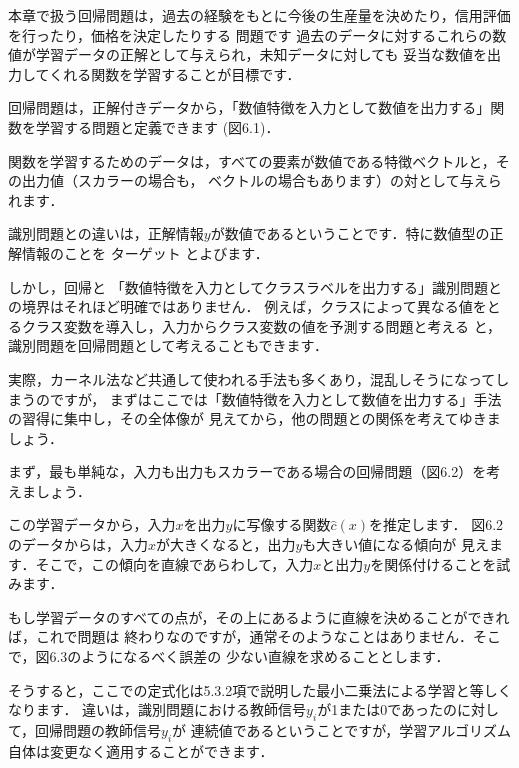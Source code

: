 
本章で扱う回帰問題は，過去の経験をもとに今後の生産量を決めたり，信用評価を行ったり，価格を決定したりする
問題です
過去のデータに対するこれらの数値が学習データの正解として与えられ，未知データに対しても
妥当な数値を出力してくれる関数を学習することが目標です．

回帰問題は，正解付きデータから，「数値特徴を入力として数値を出力する」関数を学習する問題と定義できます
(図6.1)．



関数を学習するためのデータは，すべての要素が数値である特徴ベクトルと，その出力値（スカラーの場合も，
ベクトルの場合もあります）の対として与えられます．


識別問題との違いは，正解情報$y$が数値であるということです．特に数値型の正解情報のことを
ターゲット
とよびます．

しかし，回帰と
「数値特徴を入力としてクラスラベルを出力する」識別問題との境界はそれほど明確ではありません．
例えば，クラスによって異なる値をとるクラス変数を導入し，入力からクラス変数の値を予測する問題と考える
と，識別問題を回帰問題として考えることもできます．

実際，カーネル法など共通して使われる手法も多くあり，混乱しそうになってしまうのですが，
まずはここでは「数値特徴を入力として数値を出力する」手法の習得に集中し，その全体像が
見えてから，他の問題との関係を考えてゆきましょう．



まず，最も単純な，入力も出力もスカラーである場合の回帰問題（図6.2）を考えましょう．


この学習データから，入力$x$を出力$y$に写像する関数$\hat{c}(x)$を推定します．
図6.2のデータからは，入力$x$が大きくなると，出力$y$も大きい値になる傾向が
見えます．そこで，この傾向を直線であらわして，入力$x$と出力$y$を関係付けることを試みます．


もし学習データのすべての点が，その上にあるように直線を決めることができれば，これで問題は
終わりなのですが，通常そのようなことはありません．そこで，図6.3のようになるべく誤差の
少ない直線を求めることとします．


そうすると，ここでの定式化は5.3.2項で説明した最小二乗法による学習と等しくなります．
違いは，識別問題における教師信号$y_i$が1または0であったのに対して，回帰問題の教師信号$y_i$が
連続値であるということですが，学習アルゴリズム自体は変更なく適用することができます．


